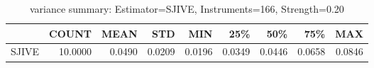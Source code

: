 \begin{table}[ht]
\centering
\caption{variance summary: Estimator=SJIVE, Instruments=166, Strength=0.20}
\begin{tabular}{lrrrrrrrr}
\toprule
 & COUNT & MEAN & STD & MIN & 25\% & 50\% & 75\% & MAX \\
\midrule
SJIVE & 10.0000 & 0.0490 & 0.0209 & 0.0196 & 0.0349 & 0.0446 & 0.0658 & 0.0846 \\
\bottomrule
\end{tabular}
\end{table}

